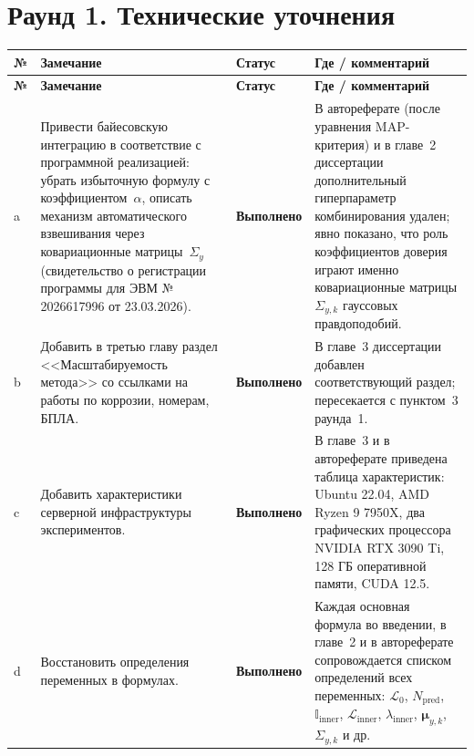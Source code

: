 \documentclass[a4paper,11pt]{article}
\newcommand{\statusDone}{{\color{statusDone}\textbf{Выполнено}}}
\begin{document}
\vspace{4pt}

\section*{Раунд 1. Технические уточнения}

\begin{longtable}{@{}p{}p{}p{}p{}@{}}
\toprule
\textbf{№} & \textbf{Замечание} & \textbf{Статус} & \textbf{Где / комментарий}\\
\midrule
\endfirsthead
\toprule
\textbf{№} & \textbf{Замечание} & \textbf{Статус} & \textbf{Где / комментарий}\\
\midrule
\endhead
\bottomrule
\endfoot

a & Привести байесовскую интеграцию в соответствие с программной реализацией: убрать избыточную формулу с коэффициентом~$\alpha$, описать механизм автоматического взвешивания через ковариационные матрицы~$\Sigma_y$ (свидетельство о регистрации программы для ЭВМ № 2026617996 от 23.03.2026).
& \statusDone
& В автореферате (после уравнения MAP-критерия) и в главе~2 диссертации дополнительный гиперпараметр комбинирования удален; явно показано, что роль коэффициентов доверия играют именно ковариационные матрицы $\Sigma_{y,k}$ гауссовых правдоподобий.\\
\midrule

b & Добавить в третью главу раздел <<Масштабируемость метода>> со ссылками на работы по коррозии, номерам, БПЛА.
& \statusDone
& В главе~3 диссертации добавлен соответствующий раздел; пересекается с пунктом~3 раунда~1.\\
\midrule

c & Добавить характеристики серверной инфраструктуры экспериментов.
& \statusDone
& В главе~3 и в автореферате приведена таблица характеристик: Ubuntu 22.04, AMD Ryzen 9 7950X, два графических процессора NVIDIA RTX 3090 Ti, 128 ГБ оперативной памяти, CUDA 12.5.\\
\midrule

d & Восстановить определения переменных в формулах.
& \statusDone
& Каждая основная формула во введении, в главе~2 и в автореферате сопровождается списком определений всех переменных: $\mathcal{L}_0$, $N_{\text{pred}}$, $\mathbb{I}_{\text{inner}}$, $\mathcal{L}_{\text{inner}}$, $\lambda_{\text{inner}}$, $\boldsymbol{\mu}_{y,k}$, $\Sigma_{y,k}$ и др.\\
\midrule


\end{longtable}
\end{document}
